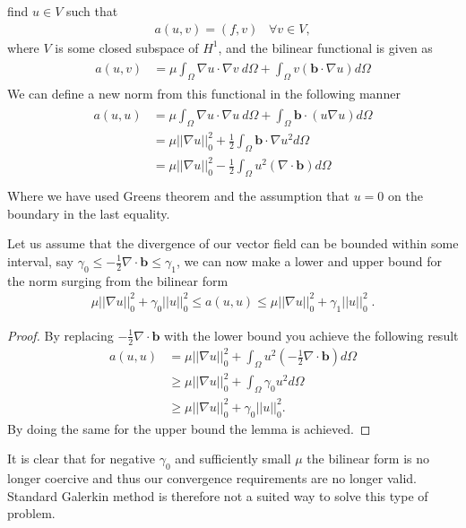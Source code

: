 find $u \in V$ such that
%
\begin{align}
	a(u,v) = (f,v) \; \; \; \forall v \in V,
	\label{eq:varFormDiffFEM}
\end{align}
%
where $V$ is some closed subspace of $H^1$, and the bilinear functional is given as 
%
\begin{align}
	\begin{split}
	a(u,v) &= \mu\int_{\Omega}\nabla u \cdot \nabla v \: d\Omega 
	+ \int_{\Omega} v (\mathbf{b} \cdot \nabla u) d \Omega
	\end{split}
	\label{eq:bilinearFunctional}
\end{align}
%
We can define a new norm from this functional in the following manner
%
\begin{align}
\begin{split}
	a(u,u) &= \mu\int_{\Omega}\nabla u \cdot \nabla u \: d\Omega 
	+ \int_{\Omega}  \mathbf{b} \cdot (u\nabla u) d \Omega\\
	       &= \mu||\nabla u||^2_0 
	+ \frac{1}{2}\int_{\Omega} \mathbf{b} \cdot \nabla u^2 d \Omega \\
	       &= \mu||\nabla u||^2_0 
	- \frac{1}{2}\int_{\Omega} u^2  (\nabla \cdot \mathbf{b})  d \Omega \\
\end{split}
	\label{eq:bilinearFunctional}
\end{align}
%
Where we have used Greens theorem and the assumption that $u=0$ on the boundary in the last equality. 

\begin{lemma}
Let us assume that the divergence of our vector field can be bounded within some interval, say  $\gamma_0 \leq -\frac{1}{2}\nabla \cdot \mathbf{b} \leq \gamma_1 $, we can now make a lower and upper bound for the norm surging from the bilinear form 
%
\begin{align}
	\mu||\nabla u||^2_0 + \gamma_0||u||^2_0 \leq a(u,u) \leq \mu||\nabla u||^2_0 + \gamma_1||u||^2_0\; .
	\label{eq:bilinearOperatorBounds}
\end{align}
%
\end{lemma}
%
\begin{proof}
By replacing $-\frac{1}{2}\nabla \cdot \mathbf{b} $ with the lower bound you achieve the following result
\begin{align}
 a(u,u) &= \mu||\nabla u||^2_0 +
	\int_{\Omega} u^2 (- \frac{1}{2}\nabla \cdot \mathbf{b}) d \Omega \\
	&\geq \mu||\nabla u||^2_0 
	+ \int_{\Omega} \gamma_0 u^2 d \Omega \\
	&\geq \mu||\nabla u||^2_0 
	+ \gamma_0|| u||_0^2.
	\label{eq:proof}
\end{align}
By doing the same for the upper bound the lemma is achieved.
\end{proof}
It is clear that for negative $\gamma_0$ and sufficiently small $\mu$ the bilinear form is no longer coercive and thus our convergence requirements are no longer valid. Standard Galerkin method is therefore not a suited way to solve this type of problem. 
%
%
